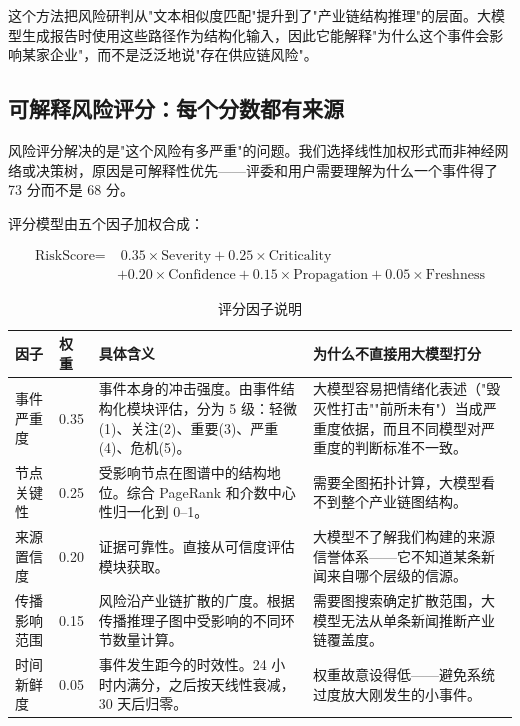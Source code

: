 \documentclass[12pt,a4paper]{ctexart}
\begin{document}
这个方法把风险研判从"文本相似度匹配"提升到了"产业链结构推理"的层面。大模型生成报告时使用这些路径作为结构化输入，因此它能解释"为什么这个事件会影响某家企业"，而不是泛泛地说"存在供应链风险"。

\subsection{可解释风险评分：每个分数都有来源}

风险评分解决的是"这个风险有多严重"的问题。我们选择线性加权形式而非神经网络或决策树，原因是可解释性优先——评委和用户需要理解为什么一个事件得了 73 分而不是 68 分。

评分模型由五个因子加权合成：

\[
\begin{aligned}
\text{RiskScore} = &\; 0.35 \times \text{Severity} + 0.25 \times \text{Criticality} \\
& + 0.20 \times \text{Confidence} + 0.15 \times \text{Propagation} + 0.05 \times \text{Freshness}
\end{aligned}
\]

\begin{table}[htbp]
\centering
\caption{评分因子说明}
\begin{tabularx}{\textwidth}{p{2.8cm}p{1.2cm}p{4.3cm}X}
\toprule
因子 & 权重 & 具体含义 & 为什么不直接用大模型打分 \\
\midrule
事件严重度 & 0.35 & 事件本身的冲击强度。由事件结构化模块评估，分为 5 级：轻微(1)、关注(2)、重要(3)、严重(4)、危机(5)。 & 大模型容易把情绪化表述（"毁灭性打击""前所未有"）当成严重度依据，而且不同模型对严重度的判断标准不一致。 \\
节点关键性 & 0.25 & 受影响节点在图谱中的结构地位。综合 PageRank 和介数中心性归一化到 0--1。 & 需要全图拓扑计算，大模型看不到整个产业链图结构。 \\
来源置信度 & 0.20 & 证据可靠性。直接从可信度评估模块获取。 & 大模型不了解我们构建的来源信誉体系——它不知道某条新闻来自哪个层级的信源。 \\
传播影响范围 & 0.15 & 风险沿产业链扩散的广度。根据传播推理子图中受影响的不同环节数量计算。 & 需要图搜索确定扩散范围，大模型无法从单条新闻推断产业链覆盖度。 \\
时间新鲜度 & 0.05 & 事件发生距今的时效性。24 小时内满分，之后按天线性衰减，30 天后归零。 & 权重故意设得低——避免系统过度放大刚发生的小事件。 \\
\bottomrule
\end{tabularx}
\end{table}
\end{document}
